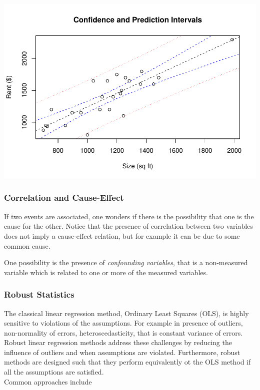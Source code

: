 \documentclass[
]{article}
\begin{document}
\includegraphics{Tests_and_Applications_files/figure-latex/unnamed-chunk-44-1.pdf}

\hypertarget{correlation-and-cause-effect}{%
\subsubsection{Correlation and
Cause-Effect}\label{correlation-and-cause-effect}}

If two events are associated, one wonders if there is the possibility
that one is the cause for the other. Notice that the presence of
correlation between two variables does not imply a cause-effect
relation, but for example it can be due to some common cause.

One possibility is the presence of \emph{confounding variables}, that is
a non-measured variable which is related to one or more of the measured
variables.

\hypertarget{robust-statistics-1}{%
\subsubsection{Robust Statistics}\label{robust-statistics-1}}

The classical linear regression method, Ordinary Least Squares (OLS), is
highly sensitive to violations of the assumptions. For example in
presence of outliers, non-normality of errors, heteroscedasticity, that
is constant variance of errors. Robust linear regression methods address
these challenges by reducing the influence of outliers and when
assumptions are violated. Furthermore, robust methods are designed such
that they perform equivalently ot the OLS method if all the assumptions
are satisfied.\\
Common approaches include
\end{document}
